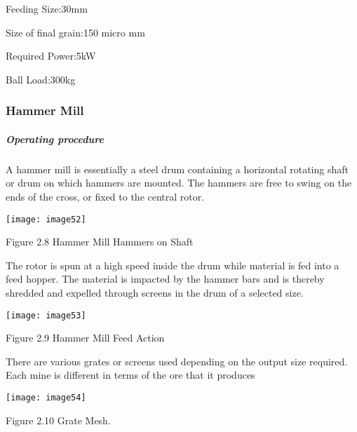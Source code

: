 \noindent Feeding Size:30mm

\noindent Size of final grain:150 micro mm

\noindent Required Power:5kW

\noindent Ball Load:300kg


\subsubsection{ Hammer Mill}


\subparagraph{ Operating procedure}

\noindent A hammer mill is essentially a steel drum containing a horizontal rotating shaft or drum on which hammers are mounted. The hammers are free to swing on the ends of the cross, or fixed to the central rotor. \par

\noindent \texttt{[image: image52]}

\noindent Figure 2.8 Hammer Mill Hammers on Shaft

\noindent The rotor is spun at a high speed inside the drum while material is fed into a feed hopper. The material is impacted by the hammer bars and is thereby shredded and expelled through screens in the drum of a selected size.\par

\noindent \texttt{[image: image53]}

\noindent Figure 2.9 Hammer Mill Feed Action

\noindent There are various grates or screens used depending on the output size required. Each mine is different in terms of the ore that it produces

\noindent \texttt{[image: image54]}

\noindent Figure 2.10 Grate Mesh.

\noindent 

\noindent \eject \textbf{\textit{}}
